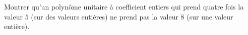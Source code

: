 Montrer qu'un polynôme unitaire à coefficient entiers qui prend quatre fois la valeur $5$ (sur des valeurs entières) ne prend pas la valeur $8$ (sur une valeur entière).
